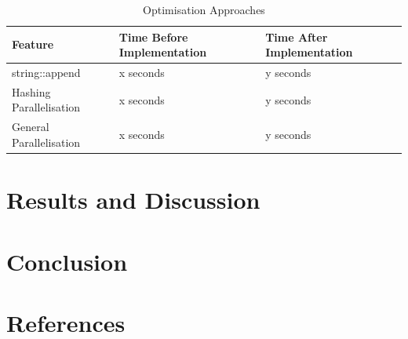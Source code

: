\documentclass[12pt, a4paper]{article}
\begin{document}
\begin{table}[H]
    \centering
    \begin{tabular}{| l | l | l |}
    \hline
    Feature & Time Before Implementation & Time After Implementation \\ \hline
    string::append & x seconds & y seconds \\ \hline
    Hashing Parallelisation & x seconds & y seconds \\ \hline
    General Parallelisation & x seconds & y seconds \\ \hline
    \end{tabular}
    \caption{Optimisation Approaches}
\end{table}

\section{Results and Discussion}

\section{Conclusion}

\section{References}
\end{document}

